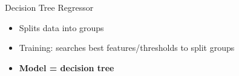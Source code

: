 \documentclass[9.5pt]{beamer}
\begin{document}
    \begin{frame}{Decision Tree Regressor}
        \begin{itemize}
            \item Splits data into groups
            \item Training: searches best features/thresholds to split groups
            \item \textbf{Model = decision tree}
        \end{itemize}
        \begin{columns}[onlytextwidth]
            \begin{figure}
                \centering
            \end{figure}
            \begin{figure}
                \centering
            \end{figure}
        \end{columns}
    \end{frame}
\end{document}
